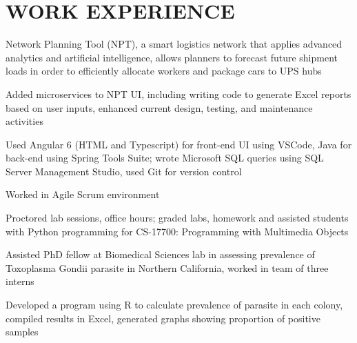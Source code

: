 \documentclass[]{deedy-resume-openfont}
\begin{document}
\hfill
\begin{minipage}[t]{0.67\textwidth} 


\section{WORK EXPERIENCE}

\vspace{\topsep} %
\begin{tightemize}
\item Network Planning Tool (NPT), a smart logistics network that applies advanced analytics and artificial intelligence, allows planners to forecast future shipment loads in order to efficiently allocate workers and package cars to UPS hubs
\item Added microservices to NPT UI, including writing code to generate Excel reports based on user inputs, enhanced current design, testing, and maintenance activities
\item Used Angular 6 (HTML and Typescript) for front-end UI using VSCode, Java for back-end using Spring Tools Suite; wrote Microsoft SQL queries using SQL Server Management Studio, used Git for version control
\item Worked in Agile Scrum environment
\end{tightemize}
\sectionsep

\begin{tightemize}
\item Proctored lab sessions, office hours; graded labs, homework and assisted students with Python programming for CS-17700: Programming with Multimedia Objects
\end{tightemize}
\sectionsep

\begin{tightemize}
\item Assisted PhD fellow at Biomedical Sciences lab in assessing prevalence of Toxoplasma Gondii parasite in Northern California, worked in team of three interns
\item Developed a program using R to calculate prevalence of parasite in each colony, compiled results in Excel, generated graphs showing proportion of positive samples
\end{tightemize}
\sectionsep


\end{minipage}
\end{document}
